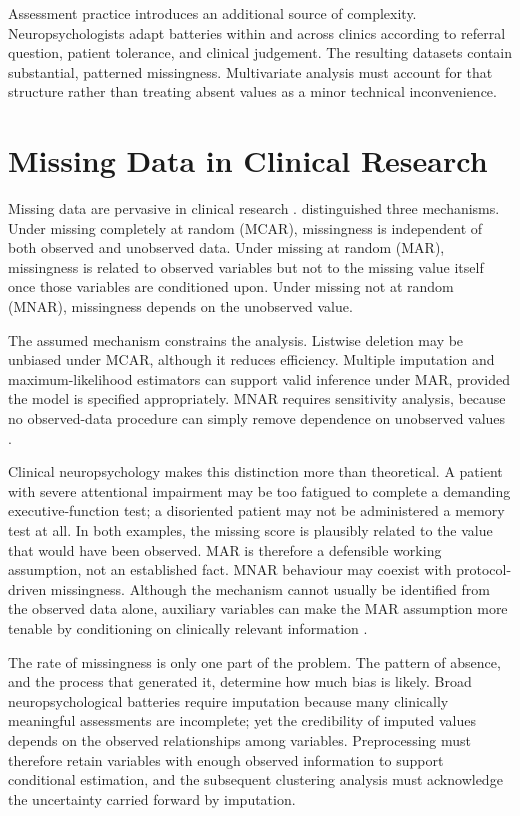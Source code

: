 Assessment practice introduces an additional source of complexity. Neuropsychologists adapt batteries within and across clinics according to referral question, patient tolerance, and clinical judgement. The resulting datasets contain substantial, patterned missingness. Multivariate analysis must account for that structure rather than treating absent values as a minor technical inconvenience.


\section{Missing Data in Clinical Research}

Missing data are pervasive in clinical research \parencite{gravesteijn2021missing, nielson2020statistical}. \textcite{rubin1976inference} distinguished three mechanisms. Under missing completely at random (MCAR), missingness is independent of both observed and unobserved data. Under missing at random (MAR), missingness is related to observed variables but not to the missing value itself once those variables are conditioned upon. Under missing not at random (MNAR), missingness depends on the unobserved value.

The assumed mechanism constrains the analysis. Listwise deletion may be unbiased under MCAR, although it reduces efficiency. Multiple imputation and maximum-likelihood estimators can support valid inference under MAR, provided the model is specified appropriately. MNAR requires sensitivity analysis, because no observed-data procedure can simply remove dependence on unobserved values \parencite{rubin1987multiple}.

Clinical neuropsychology makes this distinction more than theoretical. A patient with severe attentional impairment may be too fatigued to complete a demanding executive-function test; a disoriented patient may not be administered a memory test at all. In both examples, the missing score is plausibly related to the value that would have been observed. MAR is therefore a defensible working assumption, not an established fact. MNAR behaviour may coexist with protocol-driven missingness. Although the mechanism cannot usually be identified from the observed data alone, auxiliary variables can make the MAR assumption more tenable by conditioning on clinically relevant information \parencite{little2019statistical}.

The rate of missingness is only one part of the problem. The pattern of absence, and the process that generated it, determine how much bias is likely. Broad neuropsychological batteries require imputation because many clinically meaningful assessments are incomplete; yet the credibility of imputed values depends on the observed relationships among variables. Preprocessing must therefore retain variables with enough observed information to support conditional estimation, and the subsequent clustering analysis must acknowledge the uncertainty carried forward by imputation.

